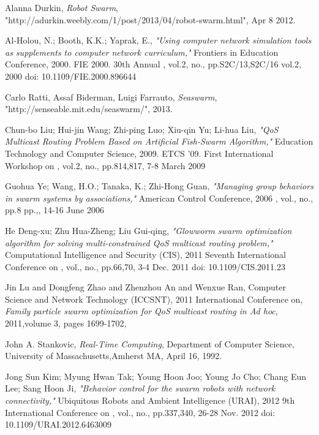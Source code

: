 \documentclass[journal]{IEEEtran}
\begin{document}
\ifCLASSOPTIONcaptionsoff
  \newpage
\fi
\begin{thebibliography}{1}

Alanna Durkin, \emph{Robot Swarm}, "http://adurkin.weebly.com/1/post/2013/04/robot-swarm.html", Apr 8 2012.

Al-Holou, N.; Booth, K.K.; Yaprak, E., \emph{"Using computer network simulation tools as supplements to computer network curriculum,"} Frontiers in Education Conference, 2000. FIE 2000. 30th Annual , vol.2, no., pp.S2C/13,S2C/16 vol.2, 2000
doi: 10.1109/FIE.2000.896644

Carlo Ratti, Assaf Biderman, Luigi Farrauto, \emph{Seaswarm}, "http://senseable.mit.edu/seaswarm/", 2013.

Chun-bo Liu; Hui-jin Wang; Zhi-ping Luo; Xiu-qin Yu; Li-hua Liu, \emph{"QoS Multicast Routing Problem Based on Artificial Fish-Swarm Algorithm,"} Education Technology and Computer Science, 2009. ETCS '09. First International Workshop on , vol.2, no., pp.814,817, 7-8 March 2009

Guohua Ye; Wang, H.O.; Tanaka, K.; Zhi-Hong Guan, \emph{"Managing group behaviors in swarm systems by associations,"} American Control Conference, 2006 , vol., no., pp.8 pp.,, 14-16 June 2006

He Deng-xu; Zhu Hua-Zheng; Liu Gui-qing, \emph{"Glowworm swarm optimization algorithm for solving multi-constrained QoS multicast routing problem,"} Computational Intelligence and Security (CIS), 2011 Seventh International Conference on , vol., no., pp.66,70, 3-4 Dec. 2011
doi: 10.1109/CIS.2011.23

Jin Lu and Dongfeng Zhao and Zhenzhou An and Wenxue Ran,
Computer Science and Network Technology (ICCSNT), 2011 International Conference on, \emph{Family particle swarm optimization for QoS multicast routing in Ad hoc},
2011,volume 3, pages 1699-1702,

John A. Stankovic, \emph{Real-Time Computing}, Department of Computer Science, University of Massachusetts,Amherst MA, April 16, 1992.

Jong Sun Kim; Myung Hwan Tak; Young Hoon Joo; Young Jo Cho; Chang Eun Lee; Sang Hoon Ji, \emph{"Behavior control for the swarm robots with network connectivity,"} Ubiquitous Robots and Ambient Intelligence (URAI), 2012 9th International Conference on , vol., no., pp.337,340, 26-28 Nov. 2012
doi: 10.1109/URAI.2012.6463009


\end{thebibliography}
\end{document}
